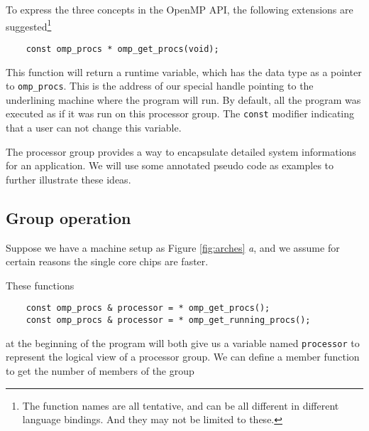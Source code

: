 To express the three concepts in the OpenMP API, the following extensions are
suggested\footnote{
The function names are all tentative, and can be all different in different
language bindings. And they may not be limited to these.}


{\footnotesize
\begin{verbatim}
    const omp_procs * omp_get_procs(void);
\end{verbatim}
}

This function will return a runtime variable, which has the data type as a
pointer to \texttt{omp\_procs}. This is the address
of our special handle pointing to the underlining machine where the program
will run. By default, all the program was executed as if it was run on
this processor group. The \texttt{const} modifier indicating that a user can
not change this variable.

The processor group provides a way to encapsulate detailed system informations
for an application. 
We will use some annotated pseudo code as examples to further illustrate these
ideas.

\subsection{Group operation}

Suppose we have a machine setup as Figure \ref{fig:arches} \emph{a}, and we
assume for certain reasons the single core chips are faster.

These functions
{\footnotesize
\begin{verbatim}
    const omp_procs & processor = * omp_get_procs();
    const omp_procs & processor = * omp_get_running_procs();
\end{verbatim}
}

at the beginning of the program will both give us a variable named
\texttt{processor} to represent the logical view of a processor group.  We can
define a member function to get the number of members of the group

